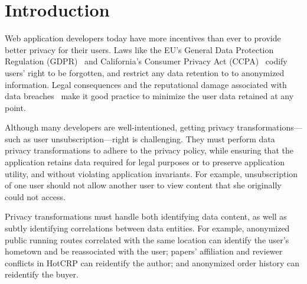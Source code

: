 \section{Introduction}
Web application developers today have more incentives than ever to provide better privacy for their
users.
%
Laws like the EU's General Data Protection Regulation (GDPR)~\cite{eu:gdpr} and California's
Consumer Privacy Act (CCPA)~\cite{ca:privacy-act} codify users' right to be forgotten, and restrict
any data retention to to anonymized information.
%
Legal consequences and the reputational damage associated with data breaches~\cite{breach:amazon,
breach:twitter, breach:fb, breach:marriott, breach:quora} make it good practice to minimize the user
data retained at any point.
%

%
Although many developers are well-intentioned, getting privacy transformations---such as user
unsubscription---right is challenging.
%
They must perform data privacy transformations to adhere to the privacy policy, while ensuring that
the application retains data required for legal purposes or to preserve application utility, and
without violating application invariants.
%
For example, unsubscription of one user should not allow another user to view content that she
originally could not access.


Privacy transformations must handle both identifying data content, as well as subtly identifying
correlations between data entities. For example, anonymized public running routes correlated with
the same location can identify the user's hometown and be reassociated with the user;
papers' affiliation and reviewer conflicts in HotCRP can reidentify the author; and anonymized order
history can reidentify the buyer.

